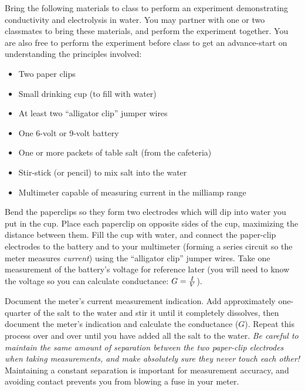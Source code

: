 
Bring the following materials to class to perform an experiment demonstrating conductivity and electrolysis in water.  You may partner with one or two classmates to bring these materials, and perform the experiment together.  You are also free to perform the experiment before class to get an advance-start on understanding the principles involved:

\begin{itemize}
\item{} Two paper clips
\vskip 5pt
\item{} Small drinking cup (to fill with water)
\vskip 5pt
\item{} At least two ``alligator clip'' jumper wires
\vskip 5pt
\item{} One 6-volt or 9-volt battery
\vskip 5pt
\item{} One or more packets of table salt (from the cafeteria)
\vskip 5pt
\item{} Stir-stick (or pencil) to mix salt into the water
\vskip 5pt
\item{} Multimeter capable of measuring current in the milliamp range
\end{itemize}

Bend the paperclips so they form two electrodes which will dip into water you put in the cup.  Place each paperclip on opposite sides of the cup, maximizing the distance between them.  Fill the cup with water, and connect the paper-clip electrodes to the battery and to your multimeter (forming a series circuit so the meter measures {\it current}) using the ``alligator clip'' jumper wires.  Take one measurement of the battery's voltage for reference later (you will need to know the voltage so you can calculate conductance: $G = {I \over V}$).

Document the meter's current measurement indication.  Add approximately one-quarter of the salt to the water and stir it until it completely dissolves, then document the meter's indication and calculate the conductance ($G$).  Repeat this process over and over until you have added all the salt to the water.  {\it Be careful to maintain the same amount of separation between the two paper-clip electrodes when taking measurements, and make absolutely sure they never touch each other!}  Maintaining a constant separation is important for measurement accuracy, and avoiding contact prevents you from blowing a fuse in your meter.

